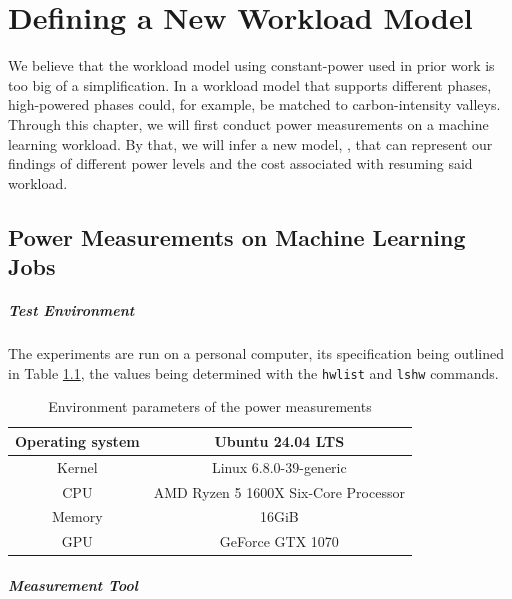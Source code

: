 \chapter{Defining a New Workload Model}

We believe that the workload model using constant-power used in prior work is too big of a simplification.
In a workload model that supports different phases, high-powered phases could, for example, be matched to carbon-intensity valleys.
Through this chapter, we will first conduct power measurements on a machine learning workload.
By that, we will infer a new model, \modelname{}, that can represent our findings of different power levels and the cost associated with resuming said workload.

\section{Power Measurements on Machine Learning Jobs}
\label{sec:power_measurements}

\paragraph{Test Environment}

The experiments are run on a personal computer, its specification being outlined in Table \ref{tab:measurement_environment}, the values being determined with the \verb|hwlist| and \verb|lshw| commands.

\begin{table}[h!]
    \centering
    \begin{tabular}{|c|c|}
    \hline
        Operating system & Ubuntu 24.04 LTS \\ \hline
        Kernel & Linux 6.8.0-39-generic \\ \hline
        CPU & AMD Ryzen 5 1600X Six-Core Processor \\ \hline
        Memory & 16GiB \\ \hline
        GPU & GeForce GTX 1070 \\ \hline
    \end{tabular}
    \caption{Environment parameters of the power measurements}
\label{tab:measurement_environment}
\end{table}

\paragraph{Measurement Tool}

